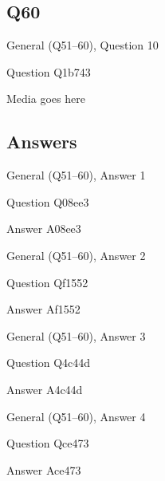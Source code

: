 \documentclass[11pt]{beamer}
\begin{document}
\subsection*{Q60}
\begin{frame}[t]{General (Q51--60), Question 10}
\vspace{2em}
\begin{block}{Question}
Q1b743
\end{block}
\begin{center}
Media goes here
\end{center}
\end{frame}
    
\subsection{Answers}

\begin{frame}[t]{General (Q51--60), Answer 1}
\vspace{2em}
\begin{block}{Question}
Q08ee3
\end{block}
\pause{}
\begin{block}{Answer}
A08ee3
\end{block}
\end{frame}
    

\begin{frame}[t]{General (Q51--60), Answer 2}
\vspace{2em}
\begin{block}{Question}
Qf1552
\end{block}
\pause{}
\begin{block}{Answer}
Af1552
\end{block}
\end{frame}
    

\begin{frame}[t]{General (Q51--60), Answer 3}
\vspace{2em}
\begin{block}{Question}
Q4c44d
\end{block}
\pause{}
\begin{block}{Answer}
A4c44d
\end{block}
\end{frame}
    

\begin{frame}[t]{General (Q51--60), Answer 4}
\vspace{2em}
\begin{block}{Question}
Qce473
\end{block}
\pause{}
\begin{block}{Answer}
Ace473
\end{block}
\end{frame}
    
\end{document}
